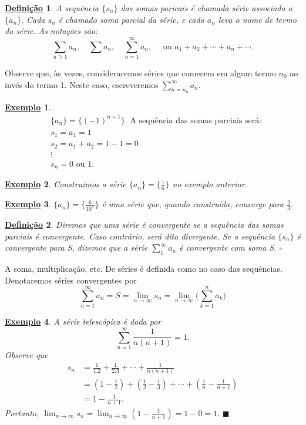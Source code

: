 \documentclass{article}
\newtheorem*{def*}{\underline{Defini\c c\~ao}}
\newtheorem{example}{\underline{Exemplo}}
\renewcommand\qedsymbol{$\blacksquare$}
\begin{document}
 \begin{def*}
  A sequ\^encia $\{s_{n}\}$ das somas paricais \'e chamada s\'erie associada a $\{a_{n}\}.$ Cada $s_{n}$ \'e chamado soma parcial da s\'erie, e cada
 $a_{n}$ leva o nome de termo da s\'erie. As nota\c c\~oes s\~ao: 
   $$
   \sum\limits_{n\geq{1}}^{}a_{n},\quad \sum\limits_{}^{}a_{n},\quad \sum\limits_{n=1}^{\infty}a_{n},\quad\text{ ou } a_{1}+a_{2}+\cdots+a_{n}+\cdots.
   $$
 \end{def*}
 Observe que, \`as vezes, consideraremos s\'eries que comecem em algum termo $n_{0}$ ao inv\'es do termo 1. Neste caso, escreveremos 
 $\sum\limits_{n=n_{0}}^{\infty}a_{n}.$
\begin{example}
 \begin{align*}
   &\{a_{n}\} = \{(-1)^{n+1}\}.\text{ A sequ\^encia das somas parciais ser\'a:}\\
   &s_{1} = a_{1} = 1\\
   &s_{2} = a_{1} + a_{2} = 1 - 1 = 0\\
   &\vdots\\
   &s_{n} = 0\text{ ou } 1.
 \end{align*} 
\end{example}
\begin{example}
  Construimos a s\'erie $\{a_{n}\} = \biggl\{\frac{1}{n}\biggr\}$ no exemplo anterior.
\end{example}
\begin{example}
  $\{a_{n}\} = \biggl\{\frac{6}{10^{n}}\biggr\}$ \'e uma s\'erie que, quando constru\'ida, converge para $\frac{2}{3}.$
\end{example}
\begin{def*}
  Diremos que uma s\'erie \'e convergente se a sequ\^encia das somas parciais \'e convergente. Caso contr\'ario, ser\'a dita divergente.
  Se a sequ\^encia $\{s_{n}\} $ \'e convergente para S, dizemos que a s\'erie $\sum\limits_{1}^{\infty}a_{n}$ \'e convergente com soma S. $\square$
\end{def*}
  A soma, multiplica\c c\~ao, etc. De s\'eries \'e definida como no caso das sequ\^encias. Denotaremos s\'eries convergentes por 
    $$
      \sum\limits_{n=1}^{\infty}a_{n} = S = \lim_{n\to\infty}s_{n} = \lim_{n\to\infty}\biggl(\sum\limits_{k=1}^{n}a_{k}\biggr)
    $$
   \begin{example}
     A s\'erie telesc\'opica \'e dada por 
       $$
         \sum\limits_{n=1}^{\infty}\frac{1}{n(n+1)} = 1.
       $$
     Observe que 
     \begin{align*}
       s_{n} &= \frac{1}{1.2} + \frac{1}{2.3} + \cdots + \frac{1}{n(n+1)}\\
             &= (1-\frac{1}{2}) + (\frac{1}{2}-\frac{1}{3}) + \cdots + (\frac{1}{n} - \frac{1}{n+1})\\
             &= 1 - \frac{1}{n+1}.
      \end{align*}
    Portanto, $\lim_{n\to\infty}s_{n} = \lim_{n\to\infty}(1 - \frac{1}{n+1}) = 1 - 0 = 1.$ \qedsymbol
   \end{example}
\end{document}

